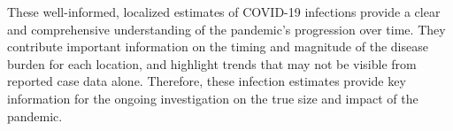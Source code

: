 These well-informed, localized estimates of COVID-19 infections 
provide a clear and comprehensive understanding of the pandemic's progression
over time. They contribute important information on the timing and
magnitude of the disease burden for each location, and highlight trends
that may not be visible from reported case data alone. Therefore, these infection
estimates provide key information for the ongoing investigation on the true size
and impact of the pandemic.
